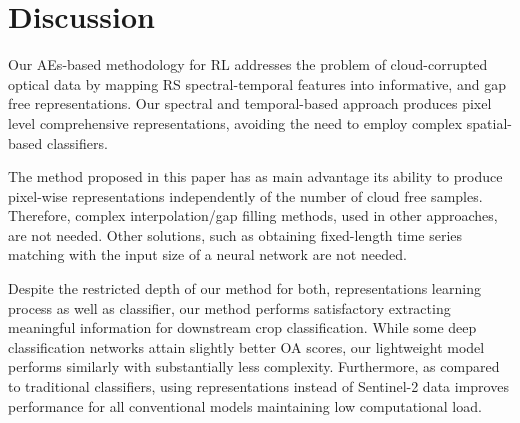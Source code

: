 \documentclass[journal,article,submit,pdftex,moreauthors]{Definitions/mdpi}
\begin{document}


\section{Discussion}
Our AEs-based methodology for RL addresses the problem of cloud-corrupted optical data by mapping RS spectral-temporal features into informative, and gap free representations.
Our spectral and temporal-based approach produces pixel level comprehensive representations, avoiding the need to employ complex spatial-based classifiers.

The method proposed in this paper has as main advantage its ability to produce pixel-wise representations independently of the number of cloud free samples.
Therefore, complex interpolation/gap filling methods, used in other approaches, are not needed.
Other solutions, such as obtaining fixed-length time series matching with the input size of a neural network are not needed.


Despite the restricted depth of our method for both, representations learning process as well as classifier, our method performs satisfactory extracting meaningful information for downstream crop classification. 
While some deep classification networks attain slightly better OA scores, our lightweight model performs similarly with substantially less complexity. Furthermore, as compared to traditional classifiers, using representations instead of Sentinel-2 data improves performance for all conventional models maintaining low computational load.
\end{document}
